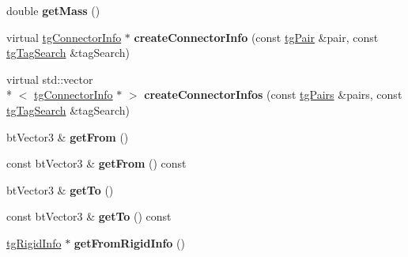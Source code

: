 \begin{DoxyCompactItemize}
\item 
\hypertarget{classtg_r_b_string_info_a4e21348cf38f77a34114db72b21c0dad}{double {\bfseries get\-Mass} ()}\label{classtg_r_b_string_info_a4e21348cf38f77a34114db72b21c0dad}

\item 
\hypertarget{classtg_connector_info_a4442bb9d3c65ad34ae6503fbfb02b411}{virtual \hyperlink{classtg_connector_info}{tg\-Connector\-Info} $\ast$ {\bfseries create\-Connector\-Info} (const \hyperlink{classtg_pair}{tg\-Pair} \&pair, const \hyperlink{classtg_tag_search}{tg\-Tag\-Search} \&tag\-Search)}\label{classtg_connector_info_a4442bb9d3c65ad34ae6503fbfb02b411}

\item 
\hypertarget{classtg_connector_info_af37c4e90660799cf6ef81528cdd39940}{virtual std\-::vector\\*
$<$ \hyperlink{classtg_connector_info}{tg\-Connector\-Info} $\ast$ $>$ {\bfseries create\-Connector\-Infos} (const \hyperlink{classtg_pairs}{tg\-Pairs} \&pairs, const \hyperlink{classtg_tag_search}{tg\-Tag\-Search} \&tag\-Search)}\label{classtg_connector_info_af37c4e90660799cf6ef81528cdd39940}

\item 
\hypertarget{classtg_connector_info_aa65e2729137e9fbbbfbfebdc6d372b48}{bt\-Vector3 \& {\bfseries get\-From} ()}\label{classtg_connector_info_aa65e2729137e9fbbbfbfebdc6d372b48}

\item 
\hypertarget{classtg_connector_info_abab475f1c1d7fe79bceda405a61c4a19}{const bt\-Vector3 \& {\bfseries get\-From} () const }\label{classtg_connector_info_abab475f1c1d7fe79bceda405a61c4a19}

\item 
\hypertarget{classtg_connector_info_a456cd53ce4b53f5690cd61136822cef2}{bt\-Vector3 \& {\bfseries get\-To} ()}\label{classtg_connector_info_a456cd53ce4b53f5690cd61136822cef2}

\item 
\hypertarget{classtg_connector_info_aff647fffb7c06cc9656fa2ba81f760db}{const bt\-Vector3 \& {\bfseries get\-To} () const }\label{classtg_connector_info_aff647fffb7c06cc9656fa2ba81f760db}

\item 
\hypertarget{classtg_connector_info_aaf9d671e6501b1faf18539fee60ca3d9}{\hyperlink{classtg_rigid_info}{tg\-Rigid\-Info} $\ast$ {\bfseries get\-From\-Rigid\-Info} ()}\label{classtg_connector_info_aaf9d671e6501b1faf18539fee60ca3d9}


\end{DoxyCompactItemize}
